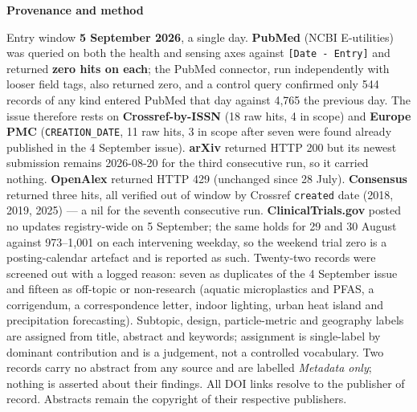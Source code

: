 \documentclass[10pt]{article}
\begin{document}


\vspace{4mm}
\begin{keybox}
{\sffamily\bfseries\footnotesize\color{Deep}Provenance and method}\\[1.2mm]
{\fontsize{7.2}{8.8}\selectfont
Entry window \textbf{5 September 2026}, a single day. \textbf{PubMed} (NCBI E-utilities)
was queried on both the health and sensing axes against \texttt{[Date - Entry]} and
returned \textbf{zero hits on each}; the PubMed connector, run independently with looser
field tags, also returned zero, and a control query confirmed only 544 records of any
kind entered PubMed that day against 4{,}765 the previous day. The issue therefore rests
on \textbf{Crossref-by-ISSN} (18 raw hits, 4 in scope) and \textbf{Europe PMC}
(\texttt{CREATION\_DATE}, 11 raw hits, 3 in scope after seven were found already published
in the 4 September issue). \textbf{arXiv} returned HTTP 200 but its newest submission
remains 2026-08-20 for the third consecutive run, so it carried nothing.
\textbf{OpenAlex} returned HTTP 429 (unchanged since 28 July). \textbf{Consensus} returned
three hits, all verified out of window by Crossref \texttt{created} date (2018, 2019,
2025) --- a nil for the seventh consecutive run.
\textbf{ClinicalTrials.gov} posted no updates registry-wide on 5 September; the same holds
for 29 and 30 August against 973--1{,}001 on each intervening weekday, so the weekend
trial zero is a posting-calendar artefact and is reported as such.
Twenty-two records were screened out with a logged reason: seven as duplicates of the
4 September issue and fifteen as off-topic or non-research (aquatic microplastics and
PFAS, a corrigendum, a correspondence letter, indoor lighting, urban heat island and
precipitation forecasting).
Subtopic, design, particle-metric and geography labels are assigned from title, abstract
and keywords; assignment is single-label by dominant contribution and is a judgement, not
a controlled vocabulary. Two records carry no abstract from any source and are labelled
\textit{Metadata only}; nothing is asserted about their findings.
All DOI links resolve to the publisher of record. Abstracts remain the copyright of their
respective publishers.\par}
\end{keybox}
\end{document}
